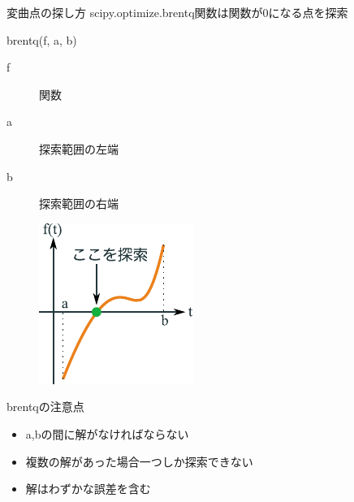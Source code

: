 \documentclass[12pt, xetex, xcolor=pdftex, dvipsnames]{beamer}
\begin{document}
\begin{frame}{変曲点の探し方}
    scipy.optimize.brentq関数は関数が0になる点を探索

    \begin{minipage}{0.5\hsize}
        \begin{block}{brentq(f, a, b)}
            \begin{description}
                \item[f] 関数
                \item[a] 探索範囲の左端
                \item[b] 探索範囲の右端
            \end{description}
        \end{block}
    \end{minipage}\begin{minipage}{0.5\hsize}
        \begin{figure}
            \centering
            \includegraphics[width=0.8\hsize]{img/brentq.pdf}
        \end{figure}
    \end{minipage}
\end{frame}
\begin{frame}{brentqの注意点}
    \begin{itemize}
        \item a,bの間に解がなければならない
        \item 複数の解があった場合一つしか探索できない
        \item 解はわずかな誤差を含む
    \end{itemize}
\end{frame}
\end{document}
